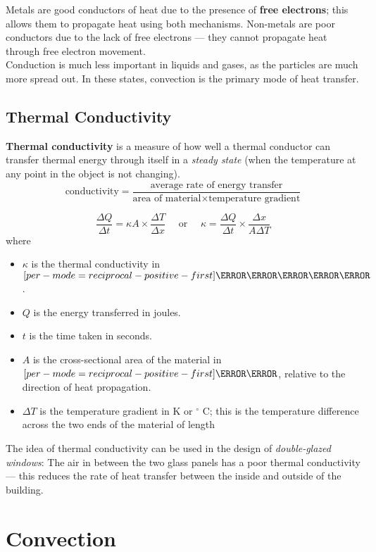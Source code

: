 \documentclass[a4paper,12pt]{article}
\let\oldsection\section
\renewcommand\section{\clearpage\oldsection}
\let\oldsi\si
\renewcommand{\si}[1]{\oldsi[per-mode=reciprocal-positive-first]{#1}}
\newcommand{\degsym}{^{\circ}}
\newcommand{\lb}{\\[8pt]}
\begin{document}
Metals are good conductors of heat due to the presence of \textbf{free electrons}; this allows them to propagate heat using both mechanisms. Non-metals are poor conductors due to the lack of free electrons --- they cannot propagate heat through free electron movement.\lb
Conduction is much less important in liquids and gases, as the particles are much more spread out. In these states, convection is the primary mode of heat transfer.


\subsection{Thermal Conductivity}

\textbf{Thermal conductivity} is a measure of how well a thermal conductor can transfer thermal energy through itself in a \textit{steady state} (when the temperature at any point in the object is not changing).
$$\text{conductivity} = \frac{\text{average rate of energy transfer}}{\text{area of material}\times\text{temperature gradient}}$$

\pagebreak

$$\frac{\Delta Q}{\Delta t} = \kappa A\times \frac{\Delta T}{\Delta x}\quad \text{ or } \quad \kappa = \frac{\Delta Q}{\Delta t}\times\frac{\Delta x}{A\Delta T}$$
where
\begin{itemize}
  \item $\kappa$ is the thermal conductivity in $\si{\watt\per\meter\per\kelvin}$.
  \item $Q$ is the energy transferred in joules.
  \item $t$ is the time taken in seconds.
  \item $A$ is the cross-sectional area of the material in $\si{\meter\squared}$, relative to the direction of heat propagation.
  \item $\Delta T$ is the temperature gradient in K or $\degsym$ C; this is the temperature difference across the two ends of the material of length
\end{itemize}

The idea of thermal conductivity can be used in the design of \textit{double-glazed windows}: The air in between the two glass panels has a poor thermal conductivity --- this reduces the rate of heat transfer between the inside and outside of the building.

\section{Convection}
\end{document}
